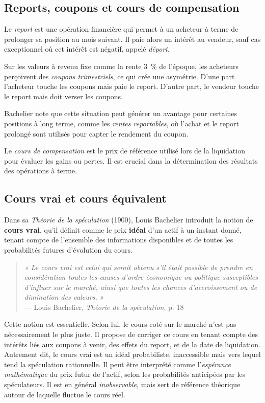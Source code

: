 \documentclass[12pt,a4paper]{article}
\begin{document}
\subsection{Reports, coupons et cours de compensation}

Le \textit{report} est une opération financière qui permet à un acheteur à terme de prolonger sa position au mois suivant. Il paie alors un intérêt au vendeur, sauf cas exceptionnel où cet intérêt est négatif, appelé \textit{déport}.

Sur les valeurs à revenu fixe comme la rente 3~\% de l’époque, les acheteurs perçoivent des \textit{coupons trimestriels}, ce qui crée une asymétrie. D'une part l’acheteur touche les coupons mais paie le report. D'autre part, le vendeur touche le report mais doit verser les coupons.

Bachelier note que cette situation peut générer un avantage pour certaines positions à long terme, comme les \textit{rentes reportables}, où l’achat et le report prolongé sont utilisés pour capter le rendement du coupon.

Le \textit{cours de compensation} est le prix de référence utilisé lors de la liquidation pour évaluer les gains ou pertes. Il est crucial dans la détermination des résultats des opérations à terme.

\subsection{Cours vrai et cours équivalent}

Dans sa \emph{Théorie de la spéculation} (1900), Louis Bachelier introduit la notion de \textbf{cours vrai}, qu’il définit comme le prix \textbf{idéal} d’un actif à un instant donné, tenant compte de l’ensemble des informations disponibles et de toutes les probabilités futures d’évolution du cours.

\begin{quote}
    \emph{« Le cours vrai est celui qui serait obtenu s’il était possible de prendre en considération toutes les causes d’ordre économique ou politique susceptibles d’influer sur le marché, ainsi que toutes les chances d’accroissement ou de diminution des valeurs. »} \\
    — Louis Bachelier, \emph{Théorie de la spéculation}, p. 18
\end{quote}

Cette notion est essentielle. Selon lui, le cours coté sur le marché n’est pas nécessairement le plus juste. Il propose de corriger ce cours en tenant compte des intérêts liés aux coupons à venir, des effets du report, et de la date de liquidation. Autrement dit, le cours vrai est un idéal probabiliste, inaccessible mais vers lequel tend la spéculation rationnelle. Il peut être interprété comme l’\textit{espérance mathématique} du prix futur de l’actif, selon les probabilités anticipées par les spéculateurs. Il est en général \textit{inobservable}, mais sert de référence théorique autour de laquelle fluctue le cours réel.
\end{document}
